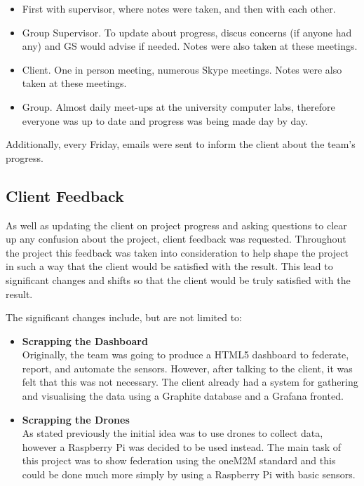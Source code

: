 \begin{itemize}
\item First with supervisor, where notes were taken, and then with each other.
\item Group Supervisor. To update about progress, discus concerns (if anyone had any) and GS would advise if needed. Notes were also taken at these meetings.
\item Client. One in person meeting, numerous Skype meetings. Notes were also taken at these meetings.
\item Group. Almost daily meet-ups at the university computer labs, therefore everyone was up to date and progress was being made day by day.
\end{itemize}

Additionally, every Friday, emails were sent to inform the client about the team's progress.

\subsection{Client Feedback}

As well as updating the client on project progress and asking questions to clear up any confusion about the project, client feedback was requested. Throughout the project this feedback was taken into consideration to help shape the project in such a way that the client would be satisfied with the result. This lead to significant changes and shifts so that the client would be truly satisfied with the result.

The significant changes include, but are not limited to:

\begin{itemize}
  \item \textbf{Scrapping the Dashboard}\\Originally, the team was going to produce a HTML5 dashboard to federate, report, and automate the sensors. However, after talking to the client, it was felt that this was not necessary. The client already had a system for gathering and visualising the data using a Graphite database and a Grafana fronted.
  \item \textbf{Scrapping the Drones}\\As stated previously the initial idea was to use drones to collect data, however a Raspberry Pi was decided to be used instead. The main task of this project was to show federation using the oneM2M standard and this could be done much more simply by using a Raspberry Pi with basic sensors.
\end{itemize}

